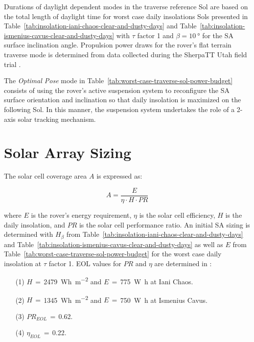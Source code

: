 \documentclass[twocolumn,letterpaper]{IEEEAerospaceCLS}  %
\newcommand{\refTab}[1]{{Table}~\ref{#1}}  %
\begin{document}
Durations of daylight dependent modes in the traverse reference Sol are based on the total length of daylight time for worst case daily insolations Sols presented in \refTab{tab:insolation-iani-chaos-clear-and-dusty-days} and \refTab{tab:insolation-ismenius-cavus-clear-and-dusty-days} with $\tau$ factor 1 and $\beta=\SI{10}{\degree}$ for the \ac{SA} surface inclination angle. Propulsion power draws for the rover's flat terrain traverse mode is determined from data collected during the SherpaTT Utah field trial \cite{Cordes2018b}.



The \textit{Optimal Pose} mode in \refTab{tab:worst-case-traverse-sol-power-budget} consists of using the rover's active suspension system to reconfigure the \ac{SA} surface orientation and inclination so that daily insolation is maximized on the following Sol. In this manner, the suspension system undertakes the role of a 2-axis solar tracking mechanism.

\section{Solar Array Sizing}

The solar cell coverage area $A$ is expressed as:

\begin{equation}
  \label{eq:solar_cell_coverage_area}
  A = \frac{E}{\eta \cdot H \cdot PR}
\end{equation}

where $E$ is the rover's energy requirement, $\eta$ is the solar cell efficiency, $H$ is the daily insolation, and $PR$ is the solar cell performance ratio. An initial \ac{SA} sizing is determined with $H_{\beta}$ from \refTab{tab:insolation-iani-chaos-clear-and-dusty-days} and \refTab{tab:insolation-ismenius-cavus-clear-and-dusty-days} as well as $E$ from \refTab{tab:worst-case-traverse-sol-power-budget} for the worst case daily insolation at $\tau$ factor 1. \ac{EOL} values for $PR$ and $\eta$ are determined in \cite{Labreche2020}:

\begin{itemize}
  \item [(1)] $H$\,$=$\,\SI{2479}{Wh.m^{-2}} and $E$\,$=$\,\SI{775}{\watt\hour} at Iani Chaos.
  \item [(2)] $H$\,$=$\,\SI{1345}{Wh.m^{-2}} and $E$\,$=$\,\SI{750}{\watt\hour} at Ismenius Cavus.
  \item [(3)] $PR_{EOL}$\,$=$\,0.62.
  \item [(4)] $\eta_{EOL}$\,$=$\,0.22.
\end{itemize}
\end{document}
